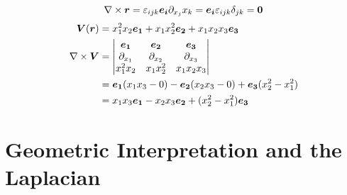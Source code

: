 \documentclass{article}
\newcommand{\pdvx}[1]{\partial_{x_{#1}}}
\begin{document}
    \example
    \[\curl \vv r = \varepsilon_{ijk}\ve i\pdvx j x_k = \ve i\varepsilon_{ijk}\delta_{jk} = \vv 0\]
    \begin{align*}
        \vv V(\vv r) &= x_1^2x_2\ve 1 + x_1x_2^2\ve 2 + x_1x_2x_3\ve 3\\
        \curl\vv V &=
        \begin{vmatrix}
            \ve 1 & \ve 2 & \ve 3\\
            \pdvx 1 & \pdvx 2 & \pdvx 3\\
            x_1^2x_2 & x_1x_2^2 & x_1x_2x_3
        \end{vmatrix}\\
        &= \ve 1(x_1x_3 - 0) - \ve 2(x_2x_3 - 0) + \ve 3(x_2^2 - x_1^2)\\
        &= x_1x_3\ve 1 - x_2x_3\ve 2 + (x_2^2 - x_1^2)\ve 3
    \end{align*}
    
    \section{Geometric Interpretation and the Laplacian}
\end{document}
